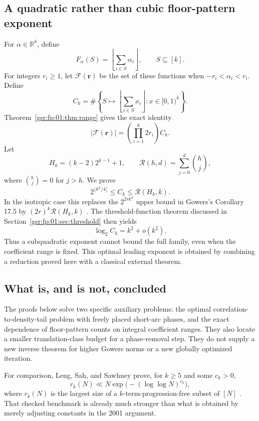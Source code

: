 \documentclass[11pt,letterpaper]{article}
\numberwithin{equation}{section}
\theoremstyle{definition}
\theoremstyle{remark}
\newcommand{\R}{\mathbb R}
\newcommand{\1}{\mathbf 1}
\newcommand{\floor}[1]{\left\lfloor#1\right\rfloor}
\newcommand{\RR}[2]{\mathcal R(#1,#2)}
\begin{document}
\subsection{A quadratic rather than cubic floor-pattern exponent}
For $\alpha\in\R^k$, define
\[
 F_\alpha(S)=\floor{\sum_{i\in S}\alpha_i},\qquad S\subseteq[k].
\]
For integers $r_i\ge1$, let $\mathcal F(\mathbf r)$ be the set of these
functions when $-r_i<\alpha_i<r_i$. Define
\[
 C_k=\#\left\{S\longmapsto\floor{\sum_{i\in S}x_i}:
                 x\in[0,1)^k\right\}.
\]
Theorem~\ref{gsr:fp:01:thm:range} gives the exact identity
\begin{equation}\label{gsr:fm:01:eq:introexact}
 |\mathcal F(\mathbf r)|=\left(\prod_{i=1}^k2r_i\right)C_k.
\end{equation}
Let
\[
 H_k=(k-2)2^{k-1}+1,\qquad
 \RR{h}{d}=\sum_{j=0}^{d}\binom hj,
\]
where $\binom hj=0$ for $j>h$. We prove
\begin{equation}\label{gsr:fm:01:eq:introcarrybounds}
 2^{\lfloor k^2/4\rfloor}\le C_k\le\RR{H_k}{k}.
\end{equation}
In the isotropic case this replaces the $2^{2rk^3}$ upper bound in
Gowers's Corollary 17.5 by $(2r)^k\RR{H_k}{k}$
\cite[Corollaries 17.5--17.6]{gowers}.
The threshold-function theorem discussed in Section~\ref{gsr:fp:01:sec:threshold}
then yields
\begin{equation}\label{gsr:fm:01:eq:introasymptotic}
 \log_2 C_k=k^2+o(k^2).
\end{equation}
Thus a subquadratic exponent cannot bound the full family, even when the
coefficient range is fixed. This optimal leading exponent is obtained by
combining a reduction proved here with a classical external theorem.

\subsection{What is, and is not, concluded}
The proofs below solve two specific auxiliary problems: the optimal
correlation-to-density-tail problem with freely placed short-arc phases,
and the exact dependence of floor-pattern counts on integral coefficient
ranges. They also locate a smaller translation-class budget for a
phase-removal step. They do not supply a new inverse theorem for higher
Gowers norms or a new globally optimized iteration.

For comparison, Leng, Sah, and Sawhney prove, for $k\ge5$ and some $c_k>0$,
\[
 r_k(N)\ll N\exp\bigl(- (\log\log N)^{c_k}\bigr),
\]
where $r_k(N)$ is the largest size of a $k$-term-progression-free subset of
$[N]$ \cite{lssbounds}. That checked benchmark is already much stronger than
what is obtained by merely adjusting constants in the 2001 argument.
\end{document}
